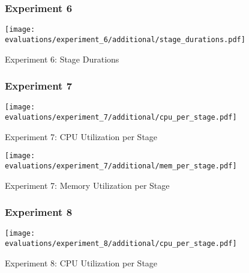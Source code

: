 \begin{figure}[H]

    \subsubsection{Experiment 6}

    \centering
    \begin{adjustwidth}{-0.2\paperwidth}{-0.2\paperwidth}
        \centering
        \texttt{[image: evaluations/experiment\_6/additional/stage\_durations.pdf]}
        \caption{Experiment 6: Stage Durations}
        \label{fig:eval_6_stage_durations}
    \end{adjustwidth}

\end{figure}

\begin{figure}[p]
    \subsubsection{Experiment 7}
    \begin{adjustwidth}{-0.2\paperwidth}{-0.2\paperwidth}
        \centering
        \texttt{[image: evaluations/experiment\_7/additional/cpu\_per\_stage.pdf]}
        \caption{Experiment 7: CPU Utilization per Stage}
        \label{fig:eval_7_cpu_per_stage}
    \end{adjustwidth}
\end{figure}

\begin{figure}[p]
    \begin{adjustwidth}{-0.2\paperwidth}{-0.2\paperwidth}
        \centering
        \texttt{[image: evaluations/experiment\_7/additional/mem\_per\_stage.pdf]}
        \caption{Experiment 7: Memory Utilization per Stage}
        \label{fig:eval_7_mem_per_stage}
    \end{adjustwidth}
\end{figure}

\begin{figure}[p]
    \subsubsection{Experiment 8}
    \begin{adjustwidth}{-0.2\paperwidth}{-0.2\paperwidth}
        \centering
        \texttt{[image: evaluations/experiment\_8/additional/cpu\_per\_stage.pdf]}
        \caption{Experiment 8: CPU Utilization per Stage}
        \label{fig:eval_8_cpu_per_stage}
    \end{adjustwidth}
\end{figure}

